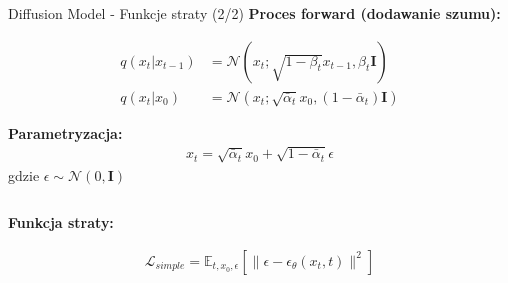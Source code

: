 \documentclass{beamer}
\begin{document}
\begin{frame}{Diffusion Model - Funkcje straty (2/2)}
    \textbf{Proces forward (dodawanie szumu):}
    \begin{tcolorbox}[
            colback=yellow!10!white,
            colframe=black!60,
            boxrule=0.5pt,
            arc=3mm,
            boxsep=0pt,
            top=1pt,
            bottom=1pt,
            left=6pt,
            right=6pt
        ]
        \vspace{-5pt}
        \begin{align*}
            q(x_t|x_{t-1}) & = \mathcal{N}(x_t; \sqrt{1-\beta_t}x_{t-1}, \beta_t\mathbf{I})             \\[-4pt]
            q(x_t|x_0)     & = \mathcal{N}(x_t; \sqrt{\bar{\alpha}_t}x_0, (1-\bar{\alpha}_t)\mathbf{I})
        \end{align*}
        \vspace{-5pt}
    \end{tcolorbox}

    \textbf{Parametryzacja:}
    \begin{align*}
        x_t = \sqrt{\bar{\alpha}_t}x_0 + \sqrt{1-\bar{\alpha}_t}\epsilon
    \end{align*}
    gdzie $\epsilon \sim \mathcal{N}(0, \mathbf{I})$

    \vspace{0.5em}

    \begin{columns}
        \begin{column}{0.5\textwidth}
            \textbf{Funkcja straty:}
            \begin{tcolorbox}[
                    colback=yellow!10!white,
                    colframe=black!60,
                    boxrule=0.5pt,
                    arc=3mm,
                    boxsep=0pt,
                    top=1pt,
                    bottom=1pt,
                    left=6pt,
                    right=6pt
                ]
                \vspace{-5pt}
                \begin{align*}
                    \mathcal{L}_{simple} = \mathbb{E}_{t,x_0,\epsilon} \left[ \|\epsilon - \epsilon_\theta(x_t, t)\|^2 \right]
                \end{align*}
                \vspace{-5pt}
            \end{tcolorbox}
        \end{column}


\end{columns}
\end{frame}
\end{document}
